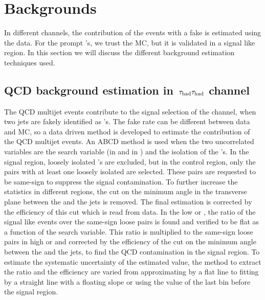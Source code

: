 \section{Backgrounds}
\label{sect:bkgLepTau}
In different channels, the contribution of the events with a fake \Tau is estimated using the data. For the prompt \Tau's, we trust 
the MC, but it is validated in a signal like region. 
In this section we will discuss the different background estimation
techniques used.

\subsection{\texorpdfstring{QCD background estimation in $\,\tau_{\rm had}\tau_{\rm had}$ channel}{QCD background estimation in tau-tau channel}}
The QCD multijet events contribute to the signal selection of the \tauTau channel, when two jets are 
fakely identified as \Tau's. The fake rate can be different between data and MC, so a data driven method is developed to estimate the 
contribution of the QCD multijet events. 
An ABCD method is used when the two uncorrelated variables are the search variable (\mttwo in \binone and \SumMT in \bintwo) and the 
isolation of the \Tau's. In the signal region, loosely isolated  \Tau's 
are excluded, but in the control region, only the pairs with at least one loosely isolated \Tau are selected. 
These pairs are requested to be same-sign to suppress the signal contamination. To further increase the statistics 
in different regions, the cut on the minimum angle in the transverse plane between the \MET and the jets is removed. The final estimation
is corrected by the efficiency of this cut which is read from data. 
In the low \mttwo or \SumMT, the ratio of the signal like events over the same-sign loose pairs 
is found and verified to be flat as a function of the search variable. 
This ratio is multiplied to the same-sign loose pairs in high \mttwo or \SumMT and corrected by the efficiency of the 
cut on the minimum angle between the \MET and the jets, to find the QCD contamination in the signal region. 
To estimate the systematic uncertainty of the estimated value, the method to extract the
ratio and the efficiency are varied from approximating by a flat line to fitting by a straight line with a floating slope 
or using the value of the  last bin before the signal region. 




